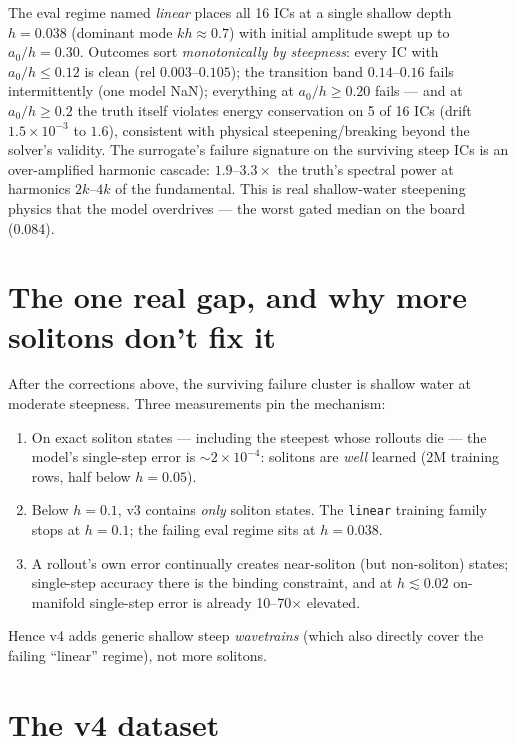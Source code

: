 \documentclass[11pt,letterpaper]{article}
\begin{document}
The eval regime named \emph{linear} places all 16 ICs at a single shallow depth
$h=0.038$ (dominant mode $kh\approx0.7$) with initial amplitude swept up to
$a_0/h=0.30$. Outcomes sort \emph{monotonically by steepness}: every IC with
$a_0/h \le 0.12$ is clean (rel $0.003$--$0.105$); the transition band
$0.14$--$0.16$ fails intermittently (one model NaN); everything at
$a_0/h \ge 0.20$ fails --- and at $a_0/h \ge 0.2$ the truth itself violates
energy conservation on 5 of 16 ICs (drift $1.5\times10^{-3}$ to $1.6$),
consistent with physical steepening/breaking beyond the solver's validity. The
surrogate's failure signature on the surviving steep ICs is an over-amplified
harmonic cascade: $1.9$--$3.3\times$ the truth's spectral power at harmonics
$2k$--$4k$ of the fundamental. This is real shallow-water steepening physics
that the model overdrives --- the worst gated median on the board (0.084).

\section{The one real gap, and why more solitons don't fix it}

After the corrections above, the surviving failure cluster is shallow water at
moderate steepness. Three measurements pin the mechanism:

\begin{enumerate}[leftmargin=1.4em, itemsep=2pt]
\item On exact soliton states --- including the steepest whose rollouts die ---
      the model's single-step error is $\sim 2\times10^{-4}$: solitons are
      \emph{well} learned (2M training rows, half below $h=0.05$).
\item Below $h=0.1$, v3 contains \emph{only} soliton states. The \texttt{linear}
      training family stops at $h=0.1$; the failing eval regime sits at
      $h=0.038$.
\item A rollout's own error continually creates near-soliton (but
      non-soliton) states; single-step accuracy there is the binding constraint,
      and at $h \lesssim 0.02$ on-manifold single-step error is already
      10--70$\times$ elevated.
\end{enumerate}

Hence v4 adds generic shallow steep \emph{wavetrains} (which also directly
cover the failing ``linear'' regime), not more solitons.

\section{The v4 dataset}
\end{document}
